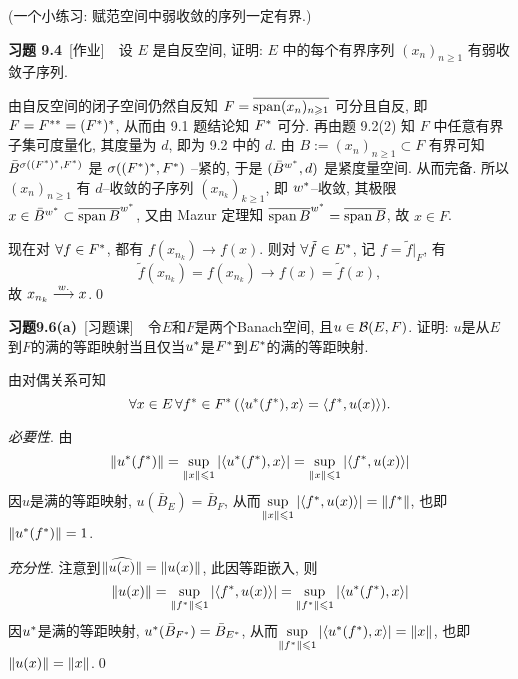 	(一个小练习: 赋范空间中弱收敛的序列一定有界.)

	\textbf{习题 9.4}\ [作业]\ \ 设 $ E $ 是自反空间, 证明: $ E $ 中的每个有界序列 $ (x_{n})_{n\geqslant1} $ 有弱收敛子序列.
	\begin{Proof}
		由自反空间的闭子空间仍然自反知 $ F=\overline{\operatorname{span}(x_{n})_{n\geqslant1}} $ 可分且自反, 即 $ F=F^{**}=(F^{*})^{*} $, 从而由 9.1 题结论知 $ F^{*} $ 可分. 再由题 9.2(2) 知 $ F $ 中任意有界子集可度量化, 其度量为 $ d $, 即为 9.2 中的 $ d $. 由 $ B:=(x_{n})_{n\geqslant1}\subset F $ 有界可知 $ \bar{B}^{\sigma((F^{*})^{*}, F^{*})} $ 是 $ \sigma((F^{*})^{*}, F^{*}) $ --紧的, 于是 $ (\bar{B}^{w^{*}}, d) $ 是紧度量空间. 从而完备. 所以 $ (x_{n})_{n\geqslant1} $ 有 $ d $--收敛的子序列 $ (x_{n_{k}})_{k\geqslant1} $, 即 $ w^{*} $--收敛, 其极限 $ x\in\bar{B}^{w^{*}}\subset\overline{\operatorname{span} B}^{w^{*}} $, 又由 Mazur 定理知 $ \overline{\operatorname{span} B}^{w^{*}}=\overline{\operatorname{span} B} $, 故 $ x\in F $.

		现在对 $ \forall f\in F^{*} $, 都有 $  f(x_{n_{k}})\to f(x) $. 则对 $ \forall \tilde{f}\in E^{*} $, 记 $ f = \tilde{f}|_{F} $, 有
		\[
			\tilde{f}(x_{n_{k}})=f(x_{n_{k}})\to f(x)=\tilde{f}(x),
		\]
		故 $ x_{n_{k}}\overset{w.}{\longrightarrow} x $.\qed
	\end{Proof}
	
	\textbf{习题9.6(a)}\ [习题课]\ \ 令$ E $和$ F $是两个Banach空间, 且$ u\in\mathcal{B}(E,F) $. 证明: $ u $是从$ E $到$ F $的满的等距映射当且仅当$ u^{*} $是$ F^{*} $到$ E^{*} $的满的等距映射.
	\begin{Proof}
	由对偶关系可知
	\[
	\forall x\in E\,\forall f^{*}\in F^{*}\,(\left\langle u^{*}(f^{*}),x \right\rangle=\left\langle f^{*},u(x) \right\rangle).
	\]
	
	\textsl{必要性}. 由
	\[
	\left\| u^{*}(f^{*}) \right\|=\sup_{\left\| x \right\|\leqslant 1}\left| \left\langle u^{*}(f^{*}),x \right\rangle \right| =\sup_{\left\| x \right\|\leqslant 1}\left| \left\langle f^{*},u(x) \right\rangle \right| 
	\]
	因$ u $是满的等距映射, $ u(\bar{B}_E)=\bar{B}_F $, 从而$ \sup\limits_{\left\| x \right\|\leqslant 1}\left| \left\langle f^{*},u(x) \right\rangle \right| =\left\| f^{*} \right\| $, 也即$ \left\| u^{*}(f^{*}) \right\|=1 $.
	
	\textsl{充分性}. 注意到$ \lVert \widehat{u(x)}\rVert=\left\| u(x) \right\| $, 此因等距嵌入, 则
	\[
	\left\| u(x) \right\|=\sup_{\left\| f^{*} \right\|\leqslant 1}\left| \left\langle f^{*},u(x) \right\rangle \right| =\sup_{\left\| f^{*} \right\|\leqslant 1}\left| \left\langle u^{*}(f^{*}),x \right\rangle \right| 
	\]
	因$ u^{*} $是满的等距映射, $ u^{*}(\bar{B}_{F^{*}})=\bar{B}_{E^{*}} $, 从而$ \sup\limits_{\left\| f^{*} \right\|\leqslant 1}\left| \left\langle u^{*}(f^{*}),x \right\rangle \right| =\left\| x \right\| $, 也即$ \left\| u(x) \right\|=\left\| x \right\| $.\qed
	\end{Proof}
	
